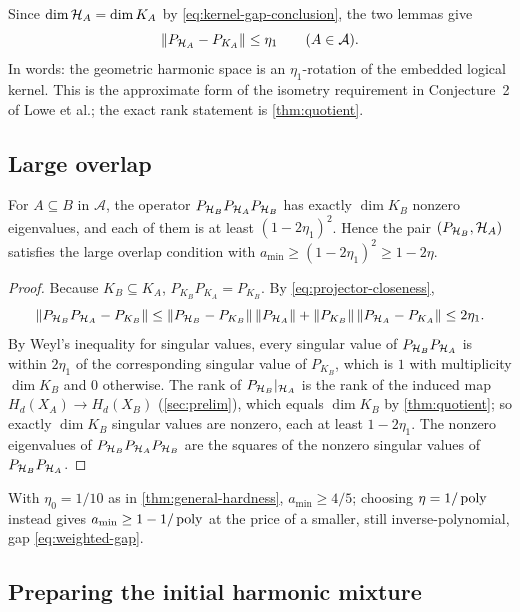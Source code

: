 Since \(\dim\mathcal{H}_A=\dim K_A\) by \cref{eq:kernel-gap-conclusion}, the two
lemmas give
\begin{equation}
\label{eq:projector-closeness}
\|P_{\mathcal{H}_A}-P_{K_A}\|\le\eta_1\qquad(A\in\mathcal A).
\end{equation}
In words: the geometric harmonic space is an \(\eta_1\)-rotation of the
embedded logical kernel.  This is the approximate form of the isometry
requirement in Conjecture~2 of Lowe et al.; the exact rank statement is
\cref{thm:quotient}.

\subsection{Large overlap}

\begin{theorem}
\label{thm:large-overlap}
For \(A\subseteq B\) in \(\mathcal A\), the operator
\(P_{\mathcal{H}_B}P_{\mathcal{H}_A}P_{\mathcal{H}_B}\) has exactly \(\dim K_B\) nonzero eigenvalues,
and each of them is at least \((1-2\eta_1)^2\).  Hence the pair
\((P_{\mathcal{H}_B},\mathcal{H}_A)\) satisfies the large overlap condition with
\(a_{\min}\ge(1-2\eta_1)^2\ge1-2\eta\).
\end{theorem}

\begin{proof}
Because \(K_B\subseteq K_A\), \(P_{K_B}P_{K_A}=P_{K_B}\).  By
\cref{eq:projector-closeness},
\[
\|P_{\mathcal{H}_B}P_{\mathcal{H}_A}-P_{K_B}\|
\le\|P_{\mathcal{H}_B}-P_{K_B}\|\,\|P_{\mathcal{H}_A}\|+\|P_{K_B}\|\,\|P_{\mathcal{H}_A}-P_{K_A}\|
\le2\eta_1 .
\]
By Weyl's inequality for singular values, every singular value of
\(P_{\mathcal{H}_B}P_{\mathcal{H}_A}\) is within \(2\eta_1\) of the corresponding singular
value of \(P_{K_B}\), which is \(1\) with multiplicity \(\dim K_B\) and \(0\)
otherwise.  The rank of \(P_{\mathcal{H}_B}|_{\mathcal{H}_A}\) is the rank of the induced
map \(H_d(X_A)\to H_d(X_B)\) (\cref{sec:prelim}), which equals \(\dim K_B\)
by \cref{thm:quotient}; so exactly \(\dim K_B\) singular values are nonzero,
each at least \(1-2\eta_1\).  The nonzero eigenvalues of
\(P_{\mathcal{H}_B}P_{\mathcal{H}_A}P_{\mathcal{H}_B}\) are the squares of the nonzero singular values
of \(P_{\mathcal{H}_B}P_{\mathcal{H}_A}\).
\end{proof}

With \(\eta_0=1/10\) as in \cref{thm:general-hardness}, \(a_{\min}\ge4/5\);
choosing \(\eta=1/\operatorname{poly}\) instead gives \(a_{\min}\ge1-1/\operatorname{poly}\) at the price
of a smaller, still inverse-polynomial, gap \cref{eq:weighted-gap}.

\subsection{Preparing the initial harmonic mixture}

